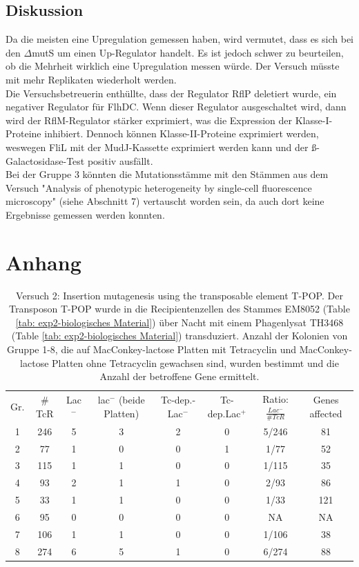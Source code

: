 \documentclass[oneside,10pt,a4paper]{report}
\begin{document}
		\section{Diskussion}
		Da die meisten eine Upregulation gemessen haben, wird vermutet, dass es sich bei den $\Delta$mutS um einen Up-Regulator handelt. Es ist jedoch schwer zu beurteilen, ob die Mehrheit wirklich eine Upregulation messen würde. Der Versuch müsste mit mehr Replikaten wiederholt werden.\\
		Die Versuchsbetreuerin enthüllte, dass der Regulator RflP deletiert wurde, ein negativer Regulator für FlhDC. Wenn dieser Regulator ausgeschaltet wird, dann wird der RflM-Regulator stärker exprimiert, was die Expression der Klasse-I-Proteine inhibiert. Dennoch können Klasse-II-Proteine exprimiert werden, weswegen FliL mit der MudJ-Kassette exprimiert werden kann und der ß-Galactosidase-Test positiv ausfällt.\\
		Bei der Gruppe 3 könnten die Mutationsstämme mit den Stämmen aus dem Versuch "Analysis of phenotypic heterogeneity by single-cell fluorescence microscopy" (siehe Abschnitt 7) vertauscht worden sein, da auch dort keine Ergebnisse gemessen werden konnten.
	
	
	\chapter{Anhang}
\begin{table}[H]
	\centering
	\caption{Versuch 2: Insertion mutagenesis using the transposable element T-POP. Der Transposon T-POP wurde in die Recipientenzellen des Stammes EM8052 (Table \ref{tab: exp2-biologisches Material}) über Nacht mit einem Phagenlysat TH3468 (Table \ref{tab: exp2-biologisches Material}) transduziert. Anzahl der Kolonien von Gruppe 1-8, die auf MacConkey-lactose Platten mit Tetracyclin und MacConkey-lactose Platten ohne Tetracyclin gewachsen sind, wurden bestimmt und die Anzahl der betroffene Gene ermittelt.}
	\label{tab: exp2-Rohdaten}
	\begin{tabular}{cccccccc}
		\toprule
		\multirow{2}{*}{Gr.} & \multirow{2}{*}{$\#$TcR} & \multirow{2}{*}{Lac$^-$}&\multirow{2}{*}{lac$^-$ (beide Platten)} & \multirow{2}{*}{Tc-dep.-Lac$^-$}& \multirow{2}{*}{Tc-dep.Lac$^+$}& \multirow{2}{*}{Ratio: $\frac{Lac^-}{\#TcR}$}&\multirow{2}{*}{\parbox[*]{1.2cm}{Genes affected}}\\
		&&&&&&&\\
		\midrule
		1 & 246 & 5 & 3 & 2 & 0 & 5/246 & 81\\
		2 & 77 & 1 & 0 & 0 & 1 & 1/77 & 52\\
		3 & 115 & 1 & 1 & 0 & 0 & 1/115& 35\\
		4 & 93 & 2 & 1 & 1 & 0 & 2/93 & 86\\
		5 & 33 & 1 & 1 & 0 & 0 & 1/33& 121\\
		6 & 95 & 0 & 0 & 0 & 0 & NA & NA\\
		7 & 106 & 1 & 1 & 0 & 0 & 1/106 & 38\\
		8 & 274 & 6 & 5 & 1 & 0 & 6/274 & 88\\
		\bottomrule			
	\end{tabular}
\end{table}
	
	
	
	
	\nocite{*}
	
	\newpage
\end{document}
